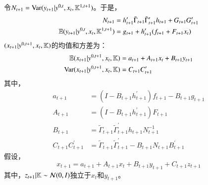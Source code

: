  \begin{lem} \label{lemma1}
     令$N_{t+1}=\mathrm{Var}(y_{t+1}\vert y^{0,t},x_t,\mathbb{K}^{1,t+1})$。于是，
     \begin{align}
         N_{t+1}&=h_{t+1}^\prime \tilde{\Gamma}_{t+1}\tilde{\Gamma}_{t+1}^\prime h_{t+1}+G_{t+1}G_{t+1}^\prime \\
         \mathbb{E}(y_{t+1}\vert y^{0,t},x_t,\mathbb{K}^{1,t+1})&=g_{t+1}+h_{t+1}^\prime (f_{t+1}+F_{t+1}x_t)
     \end{align} 
     $(x_{t+1}\vert y^{0,t+1},x_t,\mathbb{K})$的均值和方差为：
     \begin{align}
         \mathbb{E}(x_{t+1}\vert y^{0,t+1},x_t,\mathbb{K})&=a_{t+1}+A_{t+1}x_t+B_{t+1}y_{t+1} \\
         \mathrm{Var}(x_{t+1}\vert y^{0,t+1},x_t,\mathbb{K})&=C_{t+1}C_{t+1}^\prime
     \end{align}
     其中，
     \begin{align}
        a_{t+1}&=(I-B_{t+1}h_{t+1}^\prime)f_{t+1}-B_{t+1}g_{t+1}\\
        A_{t+1}&=(I-B_{t+1}h_{t+1}^\prime)F_{t+1} \\
        B_{t+1}&=\tilde{\Gamma}_{t+1}\tilde{\Gamma}_{t+1}^\prime h_{t+1}N_{t+1}^{-1} \\
        C_{t+1}C_{t+1}^\prime&=\tilde{\Gamma}_{t+1}\tilde{\Gamma}_{t+1}^\prime-B_{t+1}N_{t+1}B_{t+1}^\prime
     \end{align}
     假设，
     \begin{equation}
        x_{t+1}=a_{t+1}+A_{t+1}x_t+B_{t+1}y_{t+1}+C_{t+1}z_{t+1}
     \end{equation}
     其中，$z_{t+1}\vert\mathbb{K}\sim \mathcal{N}(0,I)$独立于$x_t$和$y_{t+1}$。
 \end{lem}
